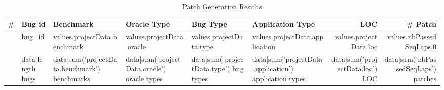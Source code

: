 \begin{table*}
  \centering
  \caption{Patch Generation Results}
  \label{tab:generation}
  \begin{tabular}{|r|l|l|l|l|l|r||r|}
    \hline
    \# & Bug id & Benchmark  & Oracle Type  & Bug Type  & Application Type & LOC & \# Patch \\
    \hline{%
    {{ loop.index }} & {{ bug_id }} & {{ values.projectData.benchmark }} & {{ values.projectData.oracle }} & {{ values.projectData.type }} & {{ values.projectData.application }} & {{ values.projectData.loc }} & {{ values.nbPassedSeqLaps.0 }} \\{%
    \hline
    & {{ data|length }} bugs & {{ data|sum('projectData.benchmark') }} benchmarks & {{ data|sum('projectData.oracle') }} oracle types & {{ data|sum('projectData.type') }} bug types & {{ data|sum('projectData.application') }} application types & {{ data|sum('projectData.loc') }} LOC & {{ data|sum('nbPassedSeqLaps') }} patches \\
    \hline
  \end{tabular}
\end{table*}